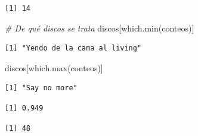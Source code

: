 \documentclass[
]{book}
\newenvironment{Shaded}{\begin{snugshade}}{\end{snugshade}}
\newcommand{\CommentTok}[1]{\textcolor[rgb]{0.56,0.35,0.01}{\textit{#1}}}
\newcommand{\FunctionTok}[1]{\textcolor[rgb]{0.00,0.00,0.00}{#1}}
\newcommand{\NormalTok}[1]{#1}
\newcommand{\SpecialCharTok}[1]{\textcolor[rgb]{0.00,0.00,0.00}{#1}}
\begin{document}
\begin{verbatim}
[1] 14
\end{verbatim}

\begin{Shaded}
\begin{Highlighting}[]
\CommentTok{\# De qué discos se trata}
\NormalTok{discos[}\FunctionTok{which.min}\NormalTok{(conteos)]}
\end{Highlighting}
\end{Shaded}

\begin{verbatim}
[1] "Yendo de la cama al living"
\end{verbatim}

\begin{Shaded}
\begin{Highlighting}[]
\NormalTok{discos[}\FunctionTok{which.max}\NormalTok{(conteos)]}
\end{Highlighting}
\end{Shaded}

\begin{verbatim}
[1] "Say no more"
\end{verbatim}

\begin{Shaded}
\end{Shaded}

\begin{verbatim}
[1] 0.949
\end{verbatim}

\begin{Shaded}
\end{Shaded}

\begin{verbatim}
[1] 48
\end{verbatim}

\begin{Shaded}
\end{Shaded}
\end{document}
